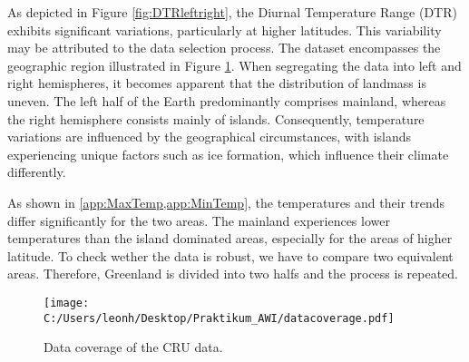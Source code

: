 
As depicted in Figure \ref{fig:DTRleftright}, the Diurnal Temperature Range (DTR) exhibits significant variations, particularly at higher
latitudes. This variability may be attributed to the data selection process. The dataset encompasses the geographic region illustrated
in Figure \ref{fig:datacoverage}. When segregating the data into left and right hemispheres, it becomes apparent that the distribution
of landmass is uneven. The left half of the Earth predominantly comprises mainland, whereas the right hemisphere consists mainly of islands.
Consequently, temperature variations are influenced by the geographical circumstances, with islands experiencing unique factors such as ice
formation, which influence their climate differently.

As shown in \cref{app:MaxTemp,app:MinTemp}, the temperatures and their trends differ significantly for the two areas. The mainland experiences 
lower temperatures than the island dominated areas, especially for the areas of higher latitude. To check wether the data is robust, we have to compare two equivalent 
areas. Therefore, Greenland is divided into two halfs and the process is repeated. 




\begin{figure}[h]
    \centering
    \texttt{[image: C:/Users/leonh/Desktop/Praktikum\_AWI/datacoverage.pdf]}
    \caption[short]{Data coverage of the CRU data.}
    \label{fig:datacoverage}
\end{figure}